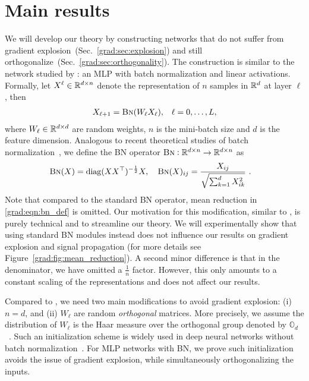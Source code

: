 \section{Main results} \label{grad:sec:main}
We will develop our theory by constructing networks that do not suffer from gradient explosion~(Sec.~\ref{grad:sec:explosion}) and still orthogonalize~(Sec.~\ref{grad:sec:orthogonality}). The construction is similar to the network studied by  \citet{daneshmand2021batch}: an MLP with batch normalization and linear activations. Formally, let $X^\ell \in \mathbb{R}^{d\times n}$ denote the representation of $n$ samples in $\mathbb{R}^d$ at layer $\ell$, then
\begin{align}
    X_{\ell+1} = \text{\sc{Bn}}(W_\ell X_{\ell}), && \ell=0, \dots, L \label{grad:eqn:mlp_def},
\end{align}
where $W_\ell \in \mathbb{R}^{d\times d}$ are random weights, $n$ is the mini-batch size and $d$ is the feature dimension. Analogous to recent theoretical studies of batch normalization~\citep{daneshmand2021batch,daneshmand2020batch}, we define the BN operator $\text{\sc{Bn}}: \mathbb{R}^{d \times n} \to \mathbb{R}^{d \times n}$ as 
\begin{align}
    \text{\sc{Bn}}(X) &= \mathrm{diag}(XX^\top)^{-\frac{1}{2}}X, \quad \text{\sc{Bn}}(X)_{ij} = \frac{X_{ij}}{\sqrt{\sum_{k=1}^d X_{ik}^2}}~.
    \label{grad:eqn:bn_def}
\end{align}
Note that compared to the standard BN operator, mean reduction in \eqref{grad:eqn:bn_def} is omitted. Our motivation for this modification, similar to \citet{daneshmand2021batch}, is purely technical and to streamline our theory. We will experimentally show that using standard BN modules instead does not influence our results on gradient explosion and signal propagation (for more details see Figure~\ref{grad:fig:mean_reduction}). A second minor difference is that in the denominator, we have omitted a $\frac1n$ factor. However, this only amounts to a constant scaling of the representations and does not affect our results. 

Compared to \citet{daneshmand2021batch}, we need two main modifications to avoid gradient explosion: (i) $n=d$, and (ii) $W_\ell$ are random \emph{orthogonal} matrices. More precisely, we assume the distribution of $W_\ell$ is the Haar measure over the orthogonal group denoted by $\mathbb{O}_d$ ~\citep{collins2006integration}. Such an initialization scheme is widely used in deep neural networks without batch normalization~\citep{saxe2013exact,xiao2018dynamical,pennington2017resurrecting}. For MLP networks with BN, we prove such initialization avoids the issue of gradient explosion, while simultaneously orthogonalizing the inputs.

